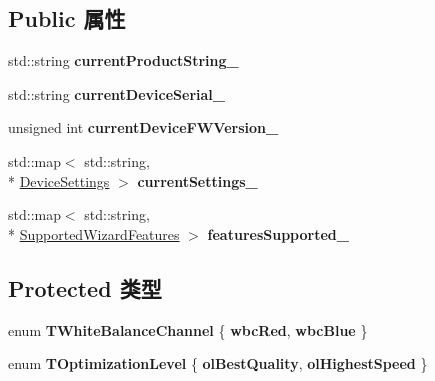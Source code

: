 \subsection*{Public 属性}
\begin{DoxyCompactItemize}
\item 
\hypertarget{class_wizard_quick_setup_a62cfc78b3dbf64fecc2a0dd3d582ea11}{std\+::string {\bfseries current\+Product\+String\+\_\+}}\label{class_wizard_quick_setup_a62cfc78b3dbf64fecc2a0dd3d582ea11}

\item 
\hypertarget{class_wizard_quick_setup_ac69fdaf32f9668ad2f5342aa9fc9bd52}{std\+::string {\bfseries current\+Device\+Serial\+\_\+}}\label{class_wizard_quick_setup_ac69fdaf32f9668ad2f5342aa9fc9bd52}

\item 
\hypertarget{class_wizard_quick_setup_a900b635e3b6ee6f1393e50797ce46750}{unsigned int {\bfseries current\+Device\+F\+W\+Version\+\_\+}}\label{class_wizard_quick_setup_a900b635e3b6ee6f1393e50797ce46750}

\item 
\hypertarget{class_wizard_quick_setup_abd468fde6a37b6d9ae4046b679b6be50}{std\+::map$<$ std\+::string, \\*
\hyperlink{struct_wizard_quick_setup_1_1_device_settings}{Device\+Settings} $>$ {\bfseries current\+Settings\+\_\+}}\label{class_wizard_quick_setup_abd468fde6a37b6d9ae4046b679b6be50}

\item 
\hypertarget{class_wizard_quick_setup_ac31b8d3ce8005a2b3d763adfa94c65bd}{std\+::map$<$ std\+::string, \\*
\hyperlink{struct_wizard_quick_setup_1_1_supported_wizard_features}{Supported\+Wizard\+Features} $>$ {\bfseries features\+Supported\+\_\+}}\label{class_wizard_quick_setup_ac31b8d3ce8005a2b3d763adfa94c65bd}

\end{DoxyCompactItemize}
\subsection*{Protected 类型}
\begin{DoxyCompactItemize}
\item 
\hypertarget{class_wizard_quick_setup_a1addc9438cd9b7518cf373656a93c2f1}{enum {\bfseries T\+White\+Balance\+Channel} \{ {\bfseries wbc\+Red}, 
{\bfseries wbc\+Blue}
 \}}\label{class_wizard_quick_setup_a1addc9438cd9b7518cf373656a93c2f1}

\item 
\hypertarget{class_wizard_quick_setup_a1220de1287e1ca57178f8a8079a35be1}{enum {\bfseries T\+Optimization\+Level} \{ {\bfseries ol\+Best\+Quality}, 
{\bfseries ol\+Highest\+Speed}
 \}}\label{class_wizard_quick_setup_a1220de1287e1ca57178f8a8079a35be1}

\end{DoxyCompactItemize}
